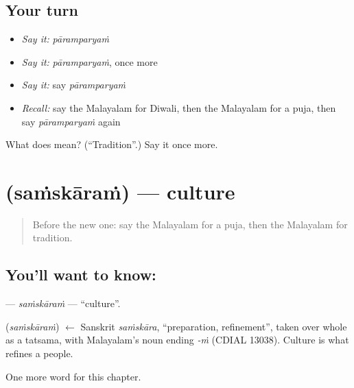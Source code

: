 \subsection*{Your turn}
\begin{itemize}
\raggedright
  \item \emph{Say it:} \emph{pāramparyaṁ}
  \item \emph{Say it:} \emph{pāramparyaṁ}, once more
  \item \emph{Say it:} say \emph{pāramparyaṁ}
  \item \emph{Recall:} say the Malayalam for Diwali, then the Malayalam for a puja, then say \emph{pāramparyaṁ} again
\end{itemize}

\begin{tcolorbox}[breakable,colback=teal!4,colframe=teal!35!black,title={Before you move on}]
What does  mean? (\textquotedblleft{}Tradition\textquotedblright{}.) Say it once more.
\end{tcolorbox}
\section[\texorpdfstring{\ml{സംസ്കാരം} (saṁskāraṁ)}{സംസ്കാരം (saṁskāraṁ)}]{ (saṁskāraṁ) — culture}

\label{lesson:ML-C326-samskaram}



\begin{quote}
Before the new one: say the Malayalam for a puja, then the Malayalam for tradition.
\end{quote}

\subsection*{You'll want to know: }
\textbf{} — \emph{saṁskāraṁ} — \textquotedblleft{}culture\textquotedblright{}.

\begin{cousinweb}
\textbf{} (\emph{saṁskāraṁ}) $\leftarrow$ Sanskrit \emph{saṁskāra}, \textquotedblleft{}preparation, refinement\textquotedblright{}, taken over whole as a tatsama, with Malayalam's noun ending \emph{-ṁ} (CDIAL 13038). Culture is what refines a people.
\end{cousinweb}

\begin{grammarlens}[title={What you've built}]
One more word for this chapter.
\end{grammarlens}

